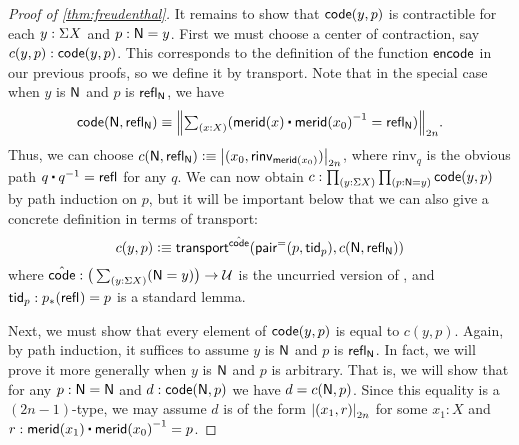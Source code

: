 \begin{proof}[Proof of \cref{thm:freudenthal}]
  It remains to show that $\code(y,p)$ is contractible for each $y:\susp X$ and $p:\north=y$.
  First we must choose a center of contraction, say $c(y,p):\code(y,p)$.
  This corresponds to the definition of the function $\encode$ in our previous proofs, so we define it by transport.
  Note that in the special case when $y$ is $\north$ and $p$ is $\refl{\north}$, we have
  \[\code(\north,\refl{\north}) \jdeq \trunc{2n}{\tsm{x:X} (\merid(x) \ct \opp{\merid(x_0)} = \refl{\north})}.\]
  Thus, we can choose $c(\north,\refl{\north})\defeq \tproj{2n}{(x_0,\mathsf{rinv}_{\merid(x_0)})}$, where $\mathrm{rinv}_q$ is the obvious path $q\ct\opp q = \refl{}$ for any $q$.
  We can now obtain $c:\prd{y:\susp X}{p:\north=y} \code(y,p)$ by path induction on $p$, but it will be important below that we can also give a concrete definition in terms of transport:
  \[ c(y,p) \defeq \transfib{\hat{\code}}{\pairpath(p,\mathsf{tid}_p)}{c(\north,\refl{\north})}
  \]
  where $\hat{\code}: \big(\sm{y:\susp X} (\north=y)\big) \to \type$ is the uncurried version of \code, and $\mathsf{tid}_p:\trans{p}{\refl{}} = p$ is a standard lemma.

  Next, we must show that every element of $\code(y,p)$ is equal to $c(y,p)$.
  Again, by path induction, it suffices to assume $y$ is $\north$ and $p$ is $\refl{\north}$.
  In fact, we will prove it more generally when $y$ is $\north$ and $p$ is arbitrary.
  That is, we will show that for any $p:\north=\north$ and $d:\code(\north,p)$ we have $d = c(\north,p)$.
  Since this equality is a $(2n-1)$-type, we may assume $d$ is of the form $\tproj{2n}{(x_1,r)}$ for some $x_1:X$ and $r:\merid(x_1) \ct \opp{\merid(x_0)} = p$.


\end{proof}
